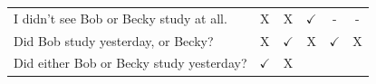 \documentclass[oneside]{report}
\theoremstyle{definition}
\theoremstyle{definition}
\theoremstyle{definition}
\theoremstyle{remark}
\begin{document}
\begin{longtable}[]{@{}lccccc@{}}
\begin{minipage}[t]{0.47\columnwidth}\raggedright\strut
I didn't see Bob or Becky study at all.\strut
\end{minipage} & \begin{minipage}[t]{0.05\columnwidth}\centering\strut
X\strut
\end{minipage} & \begin{minipage}[t]{0.05\columnwidth}\centering\strut
X\strut
\end{minipage} & \begin{minipage}[t]{0.05\columnwidth}\centering\strut
\(\checkmark\)\strut
\end{minipage} & \begin{minipage}[t]{0.09\columnwidth}\centering\strut
-\strut
\end{minipage} & \begin{minipage}[t]{0.12\columnwidth}\centering\strut
-\strut
\end{minipage}\tabularnewline
\begin{minipage}[t]{0.47\columnwidth}\raggedright\strut
Did Bob study yesterday, or Becky?\strut
\end{minipage} & \begin{minipage}[t]{0.05\columnwidth}\centering\strut
X\strut
\end{minipage} & \begin{minipage}[t]{0.05\columnwidth}\centering\strut
\(\checkmark\)\strut
\end{minipage} & \begin{minipage}[t]{0.05\columnwidth}\centering\strut
X\strut
\end{minipage} & \begin{minipage}[t]{0.09\columnwidth}\centering\strut
\(\checkmark\)\strut
\end{minipage} & \begin{minipage}[t]{0.12\columnwidth}\centering\strut
X\strut
\end{minipage}\tabularnewline
\begin{minipage}[t]{0.47\columnwidth}\raggedright\strut
Did either Bob or Becky study yesterday?\strut
\end{minipage} & \begin{minipage}[t]{0.05\columnwidth}\centering\strut
\(\checkmark\)\strut
\end{minipage} & \begin{minipage}[t]{0.05\columnwidth}\centering\strut
X\strut
\end{minipage} & \begin{minipage}[t]{0.05\columnwidth}\centering\strut

\end{minipage}
\end{longtable}
\end{document}
